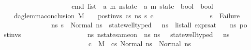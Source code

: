 \begin{isabellebody}
\ \ \ \ \ \ \ \ \ \ \ \ \ \ \ \ \ \ \ \ cmd\ list\ {\isasymRightarrow}\ {\isacharparenleft}{\kern0pt}{\isacharprime}{\kern0pt}a{\isacharcomma}{\kern0pt}\ {\isacharprime}{\kern0pt}m{\isacharparenright}{\kern0pt}\ nstate\ {\isasymRightarrow}\ {\isacharparenleft}{\kern0pt}{\isacharprime}{\kern0pt}a{\isacharcomma}{\kern0pt}\ {\isacharprime}{\kern0pt}m{\isacharparenright}{\kern0pt}\ state\ {\isasymRightarrow}\ bool\ {\isasymRightarrow}\ bool{\isachardoublequoteclose}\isanewline
\ \ \ {\isachardoublequoteopen}dag{\isacharunderscore}{\kern0pt}lemma{\isacharunderscore}{\kern0pt}conclusion\ M\ {\isasymLambda}\ {\isasymGamma}\ {\isasymOmega}\ post{\isacharunderscore}{\kern0pt}invs\ cs{}\ ns{}\ s{\isacharprime}{\kern0pt}\ c\ {\isasymequiv}\isanewline
\ \ \ \ \ \ \ \ \ \ \ \ \ \ \ s{\isacharprime}{\kern0pt}\ {\isasymnoteq}\ Failure\ {\isasymand}\ \isanewline
\ \ \ \ \ \ \ \ \ \ \ \ \ \ {\isacharparenleft}{\kern0pt}{\isasymforall}ns{}{\isacharprime}{\kern0pt}{\isachardot}{\kern0pt}\ s{\isacharprime}{\kern0pt}\ {\isacharequal}{\kern0pt}\ Normal\ ns{}{\isacharprime}{\kern0pt}\ {\isasymlongrightarrow}\ state{\isacharunderscore}{\kern0pt}well{\isacharunderscore}{\kern0pt}typed\ {\isasymLambda}\ {\isasymOmega}\ ns{}{\isacharprime}{\kern0pt}\ {\isasymand}\ list{\isacharunderscore}{\kern0pt}all\ {\isacharparenleft}{\kern0pt}expr{\isacharunderscore}{\kern0pt}sat\ {\isasymLambda}\ {\isasymGamma}\ {\isasymOmega}\ ns{}{\isacharprime}{\kern0pt}{\isacharparenright}{\kern0pt}\ post{\isacharunderscore}{\kern0pt}invs\ {\isasymand}\ \isanewline
\ \ \ \ \ \ \ \ \ \ \ \ \ \ \ \ \ {\isacharparenleft}{\kern0pt}{\isasymexists}ns{}{\isacharprime}{\kern0pt}{\isachardot}{\kern0pt}\ nstate{\isacharunderscore}{\kern0pt}same{\isacharunderscore}{\kern0pt}on\ {\isasymLambda}\ ns{}{\isacharprime}{\kern0pt}\ ns{}{\isacharprime}{\kern0pt}\ {\isacharbraceleft}{\kern0pt}{\isacharbraceright}{\kern0pt}\ {\isasymand}\ state{\isacharunderscore}{\kern0pt}well{\isacharunderscore}{\kern0pt}typed\ {\isasymLambda}\ {\isasymOmega}\ ns{}{\isacharprime}{\kern0pt}\ {\isasymand}\isanewline
\ \ \ \ \ \ \ \ \ \ \ \ \ \ \ \ \ \ \ \ \ \ \ \ \ {\isacharparenleft}{\kern0pt}{\isasymnot}c\ {\isasymlongrightarrow}\ {\isacharparenleft}{\kern0pt}M{\isacharcomma}{\kern0pt}{\isasymLambda}{\isacharcomma}{\kern0pt}{\isasymGamma}{\isacharcomma}{\kern0pt}{\isasymOmega}\ {\isasymturnstile}\ {\isasymlangle}cs{}{\isacharcomma}{\kern0pt}\ Normal\ ns{}{\isasymrangle}\ {\isacharbrackleft}{\kern0pt}{\isasymrightarrow}{\isacharbrackright}{\kern0pt}\ Normal\ ns{}{\isacharprime}{\kern0pt}{\isacharparenright}{\kern0pt}{\isacharparenright}{\kern0pt}{\isacharparenright}{\kern0pt}{\isacharparenright}{\kern0pt}{\isachardoublequoteclose}%

\end{isabellebody}
